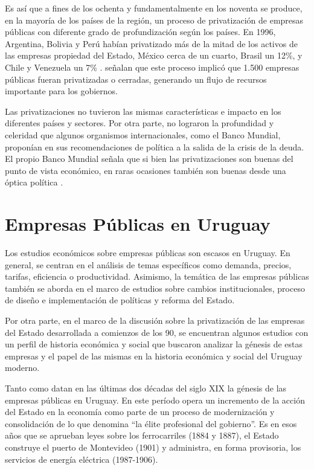 \documentclass[
  12pt,
  spanish,
]{book}
\begin{document}
Es así que a fines de los ochenta y fundamentalmente en los noventa se
produce, en la mayoría de los países de la región, un proceso de
privatización de empresas públicas con diferente grado de profundización
según los países. En 1996, Argentina, Bolivia y Perú habían privatizado
más de la mitad de los activos de las empresas propiedad del Estado,
México cerca de un cuarto, Brasil un 12\%, y Chile y Venezuela un 7\%
\citep{Ramamurti1999}. \citet{Estache2004} señalan que este proceso
implicó que 1.500 empresas públicas fueran privatizadas o cerradas,
generando un flujo de recursos importante para los gobiernos.

Las privatizaciones no tuvieron las mismas características e impacto en
los diferentes países y sectores. Por otra parte, no lograron la
profundidad y celeridad que algunos organismos internacionales, como el
Banco Mundial, proponían en sus recomendaciones de política a la salida
de la crisis de la deuda. El propio Banco Mundial señala que si bien las
privatizaciones son buenas del punto de vista económico, en raras
ocasiones también son buenas desde una óptica política
\citep{WorldBank1995}.

\hypertarget{empresas-puxfablicas-en-uruguay}{%
\section{Empresas Públicas en
Uruguay}\label{empresas-puxfablicas-en-uruguay}}

Los estudios económicos sobre empresas públicas son escasos en Uruguay.
En general, se centran en el análisis de temas específicos como demanda,
precios, tarifas, eficiencia o productividad. Asimismo, la temática de
las empresas públicas también se aborda en el marco de estudios sobre
cambios institucionales, proceso de diseño e implementación de políticas
y reforma del Estado.

Por otra parte, en el marco de la discusión sobre la privatización de
las empresas del Estado desarrollada a comienzos de los 90, se
encuentran algunos estudios con un perfil de historia económica y social
que buscaron analizar la génesis de estas empresas y el papel de las
mismas en la historia económica y social del Uruguay moderno.

Tanto \citet{Nahum1993} como \citet{Solari1983} datan en las últimas dos
décadas del siglo XIX la génesis de las empresas públicas en Uruguay. En
este período opera un incremento de la acción del Estado en la economía
como parte de un proceso de modernización y consolidación de lo que
\citet{Nahum1993} denomina ``la élite profesional del gobierno''. Es en
esos años que se aprueban leyes sobre los ferrocarriles (1884 y 1887),
el Estado construye el puerto de Montevideo (1901) y administra, en
forma provisoria, los servicios de energía eléctrica (1987-1906).
\end{document}
